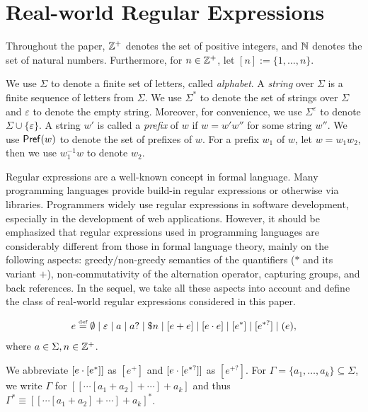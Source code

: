 
\section{Real-world Regular Expressions}\label{sec-rwre}


Throughout the paper, $\mathbb{Z}^+$ denotes the set of positive integers, and  $\mathbb{N}$ denotes the set of natural numbers. Furthermore, for $n\in \mathbb{Z}^+$, let $[n]:=\{1, \ldots, n\}$. 

We use $\Sigma$ to denote a finite set of letters, called \emph{alphabet}. A \emph{string} over $\Sigma$ is a finite sequence of letters from $\Sigma$. We use $\Sigma^*$ to denote the set of strings over $\Sigma$ and $\varepsilon$ to denote the empty string. Moreover, for convenience, we use $\Sigma^\varepsilon$ to denote $\Sigma \cup \{\varepsilon\}$. A string $w'$ is called a \emph{prefix} of $w$ if $w = w'w''$ for some string $w''$. We use $\mathsf{Pref}(w)$ to denote the set of prefixes of $w$. For a prefix $w_1$ of $w$, let $w = w_1 w_2$, then we use $w_1^{-1}w$ to denote $w_2$.


Regular expressions are a well-known concept in formal language. %
Many programming languages provide build-in regular expressions %
or otherwise via libraries. Programmers widely use regular expressions in software development, especially in the development of web applications. However, it should be emphasized that regular expressions used in programming languages are considerably different from those in formal language theory, mainly on the following aspects: greedy/non-greedy semantics of the quantifiers ($*$ and its variant $+$), non-commutativity of the alternation operator, capturing groups, and back references. In the sequel, we take all these aspects into account and define the class of real-world regular expressions considered in this paper. 
  
\begin{definition}
  	\[e \eqdef \emptyset \mid \varepsilon \mid a \mid a? \mid \$n \mid [e + e] \mid [e \concat e] \mid [e^*] \mid [e^{*?}] \mid (e), \]
  	where $a \in \Sigma, n \in \mathbb{Z}^+$. 
\end{definition}
We abbreviate $[e \cdot [e^*]]$ as $[e^+]$ and $[e \cdot [e^{*?}]]$ as $[e^{+?}]$. For $\Gamma = \{a_1, \ldots, a_k\}\subseteq \Sigma$, we write $\Gamma$ for  $[[\cdots [a_1 + a_2] + \cdots] + a_k]$ and thus $\Gamma^\ast \equiv [[\cdots [a_1 + a_2] + \cdots] + a_k]^\ast$. 

